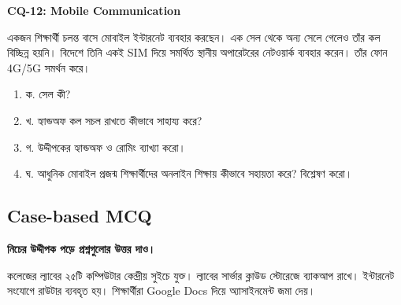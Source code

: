 \textbf{CQ-12: Mobile Communication}

একজন শিক্ষার্থী চলন্ত বাসে মোবাইল ইন্টারনেট ব্যবহার করছেন। এক সেল থেকে অন্য সেলে গেলেও তাঁর কল বিচ্ছিন্ন হয়নি। বিদেশে তিনি একই SIM দিয়ে সমর্থিত স্থানীয় অপারেটরের নেটওয়ার্ক ব্যবহার করেন। তাঁর ফোন 4G/5G সমর্থন করে।

\begin{enumerate}
\item ক. সেল কী?
\item খ. হ্যান্ডঅফ কল সচল রাখতে কীভাবে সাহায্য করে?
\item গ. উদ্দীপকের হ্যান্ডঅফ ও রোমিং ব্যাখ্যা করো।
\item ঘ. আধুনিক মোবাইল প্রজন্ম শিক্ষার্থীদের অনলাইন শিক্ষায় কীভাবে সহায়তা করে? বিশ্লেষণ করো।
\end{enumerate}

\subsection{Case-based MCQ}

\par
\textbf{নিচের উদ্দীপক পড়ে প্রশ্নগুলোর উত্তর দাও।}

কলেজের ল্যাবের ২৫টি কম্পিউটার কেন্দ্রীয় সুইচে যুক্ত। ল্যাবের সার্ভার ক্লাউড স্টোরেজে ব্যাকআপ রাখে। ইন্টারনেট সংযোগে রাউটার ব্যবহৃত হয়। শিক্ষার্থীরা Google Docs দিয়ে অ্যাসাইনমেন্ট জমা দেয়।

